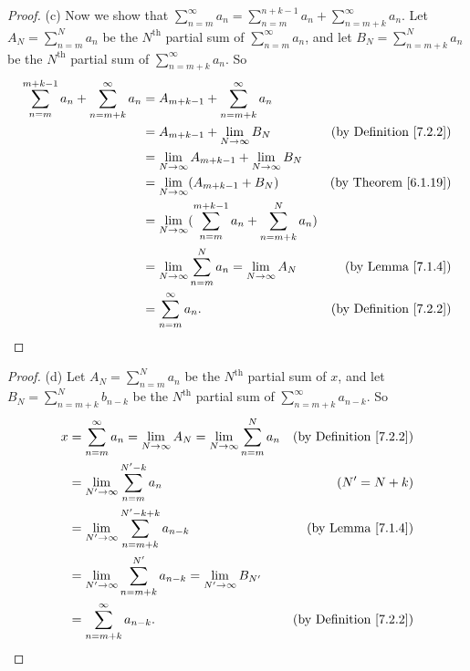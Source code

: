 \begin{proof}{(c)}
Now we show that \(\sum_{n = m}^\infty a_n = \sum_{n = m}^{n + k - 1} a_n + \sum_{n = m + k}^\infty a_n\).
Let \(A_N = \sum_{n = m}^N a_n\) be the \(N^{\text{th}}\) partial sum of \(\sum_{n = m}^\infty a_n\), and let \(B_N = \sum_{n = m + k}^N a_n\) be the \(N^{\text{th}}\) partial sum of \(\sum_{n = m + k}^\infty a_n\).
So
\begin{align*}
\sum_{n = m}^{m + k - 1} a_n + \sum_{n = m + k}^\infty a_n &= A_{m + k - 1} + \sum_{n = m + k}^\infty a_n \\
&= A_{m + k - 1} + \lim_{N \to \infty} B_N & \text{(by Definition \ref{7.2.2})} \\
&= \lim_{N \to \infty} A_{m + k - 1} + \lim_{N \to \infty} B_N \\
&= \lim_{N \to \infty} (A_{m + k - 1} + B_N) & \text{(by Theorem \ref{6.1.19})} \\
&= \lim_{N \to \infty} (\sum_{n = m}^{m + k - 1} a_n + \sum_{n = m + k}^N a_n) \\
&= \lim_{N \to \infty} \sum_{n = m}^N a_n = \lim_{N \to \infty} A_N & \text{(by Lemma \ref{7.1.4})} \\
&= \sum_{n = m}^\infty a_n. & \text{(by Definition \ref{7.2.2})}
\end{align*}
\end{proof}

\begin{proof}{(d)}
Let \(A_N = \sum_{n = m}^N a_n\) be the \(N^{\text{th}}\) partial sum of \(x\), and let \(B_N = \sum_{n = m + k}^N b_{n - k}\) be the \(N^{\text{th}}\) partial sum of \(\sum_{n = m + k}^\infty a_{n - k}\).
So
\begin{align*}
x &= \sum_{n = m}^\infty a_n = \lim_{N \to \infty} A_N = \lim_{N \to \infty} \sum_{n = m}^N a_n & \text{(by Definition \ref{7.2.2})} \\
&= \lim_{N' \to \infty} \sum_{n = m}^{N' - k} a_n & (N' = N + k) \\
&= \lim_{N' \to \infty} \sum_{n = m + k}^{N' - k + k} a_{n - k} & \text{(by Lemma \ref{7.1.4})} \\
&= \lim_{N' \to \infty} \sum_{n = m + k}^{N'} a_{n - k} = \lim_{N' \to \infty} B_{N'} \\
&= \sum_{n = m + k}^\infty a_{n - k}. & \text{(by Definition \ref{7.2.2})}
\end{align*}
\end{proof}
